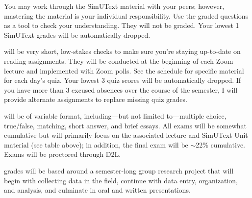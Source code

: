 \documentclass{tufte-handout}
\begin{document}
You may work through the SimUText material with your peers; however, mastering the material is your individual responsibility. Use the graded questions as a tool to check your understanding. They will not be graded. Your lowest 1 SimUText grades will be automatically dropped.

\begin{fullwidth}

 will be very short, low-stakes checks to make sure you're staying up-to-date on reading assignments. They will be conducted at the beginning of each Zoom lecture and implemented with Zoom polls. See the schedule for specific material for each day's quiz. Your lowest 3 quiz scores will be automatically dropped. If you have more than 3 excused absences over the course of the semester, I will provide alternate assignments to replace missing quiz grades.

 will be of variable format, including---but not limited to---multiple choice, true/false, matching, short answer, and brief essays. All exams will be somewhat cumulative but will primarily focus on the associated lecture and SimUText Unit material (see table above); in addition, the final exam will be $\sim$22\% cumulative. Exams will be proctored through D2L.



 grades will be based around a semester-long group research project that will begin with collecting data in the field, continue with data entry, organization, and analysis, and culminate in oral and written presentations. 


\end{fullwidth}
\end{document}
